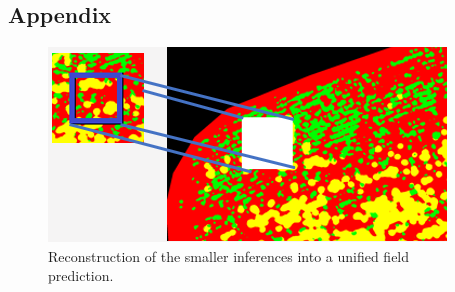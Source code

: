 \documentclass{article}
\begin{document}


\subsection{Appendix}
\begin{figure}[h!]
	\centering
	\includegraphics[width=0.7\linewidth]{"reconstruction DL"}
	\caption{Reconstruction of the smaller inferences into a unified field prediction.}
	\label{reconstruction_technique}
\end{figure}
\end{document}
